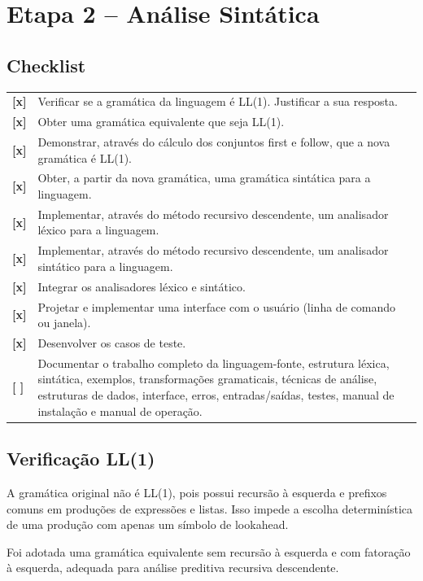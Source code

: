 \documentclass[12pt,a4paper]{article}
\newcommand{\checked}{\textbf{[x]}}
\newcommand{\unchecked}{\textbf{[ ]}}
\begin{document}
\section{Etapa 2 -- Análise Sintática}

\subsection*{Checklist}

\begin{longtable}{>{\raggedright\arraybackslash}p{} p{}}
\checked & Verificar se a gramática da linguagem é LL(1). Justificar a sua resposta. \\
\checked & Obter uma gramática equivalente que seja LL(1). \\
\checked & Demonstrar, através do cálculo dos conjuntos first e follow, que a nova gramática é LL(1). \\
\checked & Obter, a partir da nova gramática, uma gramática sintática para a linguagem. \\
\checked & Implementar, através do método recursivo descendente, um analisador léxico para a linguagem. \\
\checked & Implementar, através do método recursivo descendente, um analisador sintático para a linguagem. \\
\checked & Integrar os analisadores léxico e sintático. \\
\checked & Projetar e implementar uma interface com o usuário (linha de comando ou janela). \\
\checked & Desenvolver os casos de teste. \\
\unchecked & Documentar o trabalho completo da linguagem-fonte, estrutura léxica, sintática, exemplos, transformações gramaticais, técnicas de análise, estruturas de dados, interface, erros, entradas/saídas, testes, manual de instalação e manual de operação. \\
\end{longtable}

\subsection*{Verificação LL(1)}

A gramática original não é LL(1), pois possui recursão à esquerda e prefixos comuns em produções de expressões e listas. Isso impede a escolha determinística de uma produção com apenas um símbolo de lookahead.

Foi adotada uma gramática equivalente sem recursão à esquerda e com fatoração à esquerda, adequada para análise preditiva recursiva descendente.
\end{document}
